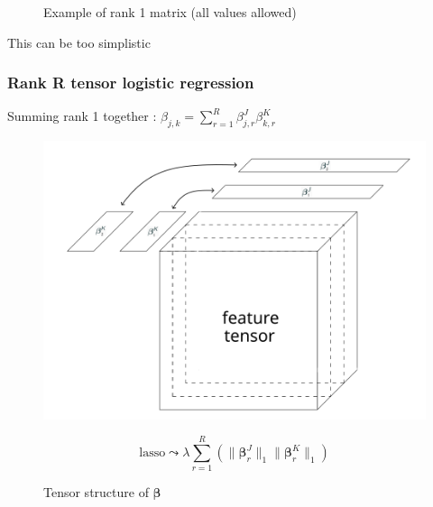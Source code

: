 \documentclass{beamer}
\begin{document}
\begin{frame}
\begin{figure}
\begin{minipage}{0.4\textwidth}
            \caption{\centering Example of rank 1 matrix (all values allowed)}
        \end{minipage}
    \end{figure}
    \begin{center}
        \vspace{5 pt}
        This can be too simplistic
    \end{center}


\end{frame}

\begin{frame}
    \frametitle{Rank R tensor logistic regression \cite{multi_rank_r}}
    \hspace{50 pt}Summing rank 1 together : $\beta_{j,k} = \sum\limits_{r = 1}^R \beta_{j,r}^J\beta_{k,r}^K$\\
    \vspace{-10 pt}
\begin{figure}
    \centering
    \begin{minipage}{0.5\textwidth}
        \centering
        \includegraphics[scale=0.25]{images/beta_tens_R.png}
        \caption{Tensor structure of $\bm{\beta}$}
    \end{minipage}
    \hfill
    \begin{minipage}{0.45\textwidth}
        \centering
        \[
        \text{lasso} \leadsto  \lambda \sum\limits_{r = 1}^R \left( \lVert \bm{\beta}_r^J \rVert_1 \lVert \bm{\beta}_r^K \rVert_1 \right)
        \]
    \end{minipage}
\end{figure}
\end{frame}
\end{document}
